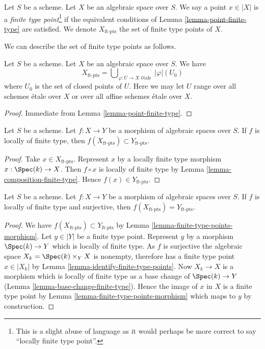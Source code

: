\begin{definition}
\label{definition-finite-type-point}
Let $S$ be a scheme. Let $X$ be an algebraic space over $S$.
We say a point $x \in |X|$ is a {\it finite type point}\footnote{This is a
slight abuse of language as it would perhaps be more correct to say
``locally finite type point''.} if the equivalent conditions of
Lemma \ref{lemma-point-finite-type}
are satisfied. We denote $X_{\text{ft-pts}}$ the set of finite type points
of $X$.
\end{definition}

\noindent
We can describe the set of finite type points as follows.

\begin{lemma}
\label{lemma-identify-finite-type-points}
Let $S$ be a scheme. Let $X$ be an algebraic space over $S$. We have
$$
X_{\text{ft-pts}} =
\bigcup\nolimits_{\varphi : U \to X\text{ \'etale }} |\varphi|(U_0)
$$
where $U_0$ is the set of closed points of $U$.
Here we may let $U$ range over all schemes \'etale over $X$ or over all
affine schemes \'etale over $X$.
\end{lemma}

\begin{proof}
Immediate from
Lemma \ref{lemma-point-finite-type}.
\end{proof}

\begin{lemma}
\label{lemma-finite-type-points-morphism}
Let $S$ be a scheme.
Let $f : X \to Y$ be a morphism of algebraic spaces over $S$.
If $f$ is locally of finite type, then
$f(X_{\text{ft-pts}}) \subset Y_{\text{ft-pts}}$.
\end{lemma}

\begin{proof}
Take $x \in X_{\text{ft-pts}}$. Represent $x$ by a locally finite type morphism
$x : \Spec(k) \to X$. Then $f \circ x$ is locally of finite type by
Lemma \ref{lemma-composition-finite-type}.
Hence $f(x) \in Y_{\text{ft-pts}}$.
\end{proof}

\begin{lemma}
\label{lemma-finite-type-points-surjective-morphism}
Let $S$ be a scheme.
Let $f : X \to Y$ be a morphism of algebraic spaces over $S$.
If $f$ is locally of finite type and surjective, then
$f(X_{\text{ft-pts}}) = Y_{\text{ft-pts}}$.
\end{lemma}

\begin{proof}
We have $f(X_{\text{ft-pts}}) \subset Y_{\text{ft-pts}}$ by
Lemma \ref{lemma-finite-type-points-morphism}.
Let $y \in |Y|$ be a finite type point. Represent $y$ by a morphism
$\Spec(k) \to Y$ which is locally of finite type.
As $f$ is surjective the algebraic space
$X_k = \Spec(k) \times_Y X$ is nonempty, therefore
has a finite type point $x \in |X_k|$ by
Lemma \ref{lemma-identify-finite-type-points}.
Now $X_k \to X$ is a morphism which is locally of finite type as a base change
of $\Spec(k) \to Y$
(Lemma \ref{lemma-base-change-finite-type}).
Hence the image of $x$ in $X$ is a finite type point by
Lemma \ref{lemma-finite-type-points-morphism}
which maps to $y$ by construction.
\end{proof}


